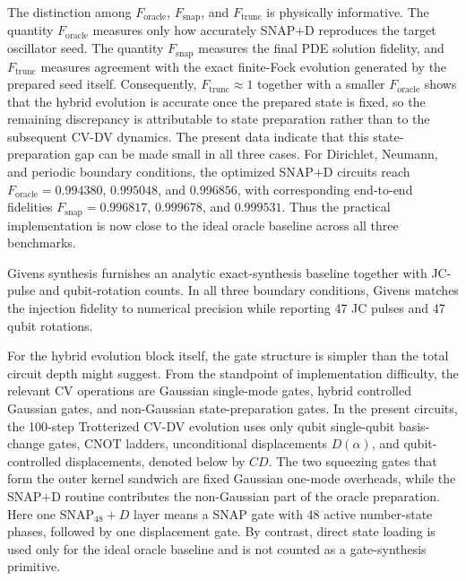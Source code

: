 The distinction among $F_{\mathrm{oracle}}$, $F_{\mathrm{snap}}$, and $F_{\mathrm{trunc}}$ is physically informative. The quantity $F_{\mathrm{oracle}}$ measures only how accurately SNAP$+$D reproduces the target oscillator seed. The quantity $F_{\mathrm{snap}}$ measures the final PDE solution fidelity, and $F_{\mathrm{trunc}}$ measures agreement with the exact finite-Fock evolution generated by the prepared seed itself. Consequently, $F_{\mathrm{trunc}}\approx 1$ together with a smaller $F_{\mathrm{oracle}}$ shows that the hybrid evolution is accurate once the prepared state is fixed, so the remaining discrepancy is attributable to state preparation rather than to the subsequent CV-DV dynamics. The present data indicate that this state-preparation gap can be made small in all three cases. For Dirichlet, Neumann, and periodic boundary conditions, the optimized SNAP$+$D circuits reach $F_{\mathrm{oracle}}=0.994380$, $0.995048$, and $0.996856$, with corresponding end-to-end fidelities $F_{\mathrm{snap}}=0.996817$, $0.999678$, and $0.999531$. Thus the practical implementation is now close to the ideal oracle baseline across all three benchmarks.

Givens synthesis furnishes an analytic exact-synthesis baseline together with JC-pulse and qubit-rotation counts. In all three boundary conditions, Givens matches the injection fidelity to numerical precision while reporting 47 JC pulses and 47 qubit rotations.

For the hybrid evolution block itself, the gate structure is simpler than the total circuit depth might suggest. From the standpoint of implementation difficulty, the relevant CV operations are Gaussian single-mode gates, hybrid controlled Gaussian gates, and non-Gaussian state-preparation gates. In the present circuits, the 100-step Trotterized CV-DV evolution uses only qubit single-qubit basis-change gates, CNOT ladders, unconditional displacements $D(\alpha)$, and qubit-controlled displacements, denoted below by $CD$. The two squeezing gates that form the outer kernel sandwich are fixed Gaussian one-mode overheads, while the SNAP$+$D routine contributes the non-Gaussian part of the oracle preparation. Here one $\mathrm{SNAP}_{48}+D$ layer means a SNAP gate with 48 active number-state phases, followed by one displacement gate. By contrast, direct state loading is used only for the ideal oracle baseline and is not counted as a gate-synthesis primitive.

